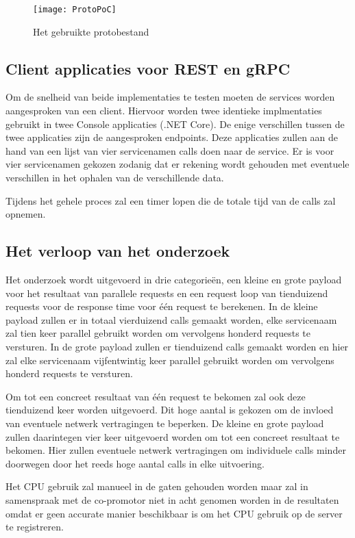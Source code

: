 \begin{figure}[H]
    \centering
    \texttt{[image: ProtoPoC]}
    \caption[Proof-Of-Concept protobestand]{Het gebruikte protobestand}
    \label{fig:ProtoPoC}
\end{figure}

\subsection{Client applicaties voor REST en gRPC}
\label{subsec:Client applicaties voor REST en gRPC}

Om de snelheid van beide implementaties te testen moeten de services worden aangesproken van een client. Hiervoor worden twee identieke implmentaties gebruikt in twee Console applicaties (.NET Core). De enige verschillen tussen de twee applicaties zijn de aangesproken endpoints. Deze applicaties zullen aan de hand van een lijst van vier servicenamen calls doen naar de service. Er is voor vier servicenamen gekozen zodanig dat er rekening wordt gehouden met eventuele verschillen in het ophalen van de verschillende data.

Tijdens het gehele proces zal een timer lopen die de totale tijd van de calls zal opnemen.

\subsection{Het verloop van het onderzoek}
\label{subsec:Het verloop van het onderzoek}

Het onderzoek wordt uitgevoerd in drie categorieën, een kleine en grote payload voor het resultaat van parallele requests en een request loop van tienduizend requests voor de response time voor één request te berekenen. In de kleine payload zullen er in totaal vierduizend calls gemaakt worden, elke servicenaam zal tien keer parallel gebruikt worden om vervolgens honderd requests te versturen. In de grote payload zullen er tienduizend calls gemaakt worden en hier zal elke servicenaam vijfentwintig keer parallel gebruikt worden om vervolgens honderd requests te versturen.

Om tot een concreet resultaat van één request te bekomen zal ook deze tienduizend keer worden uitgevoerd. Dit hoge aantal is gekozen om de invloed van eventuele netwerk vertragingen te beperken.
De kleine en grote payload zullen daarintegen vier keer uitgevoerd worden om tot een concreet resultaat te bekomen. Hier zullen eventuele netwerk vertragingen om individuele calls minder doorwegen door het reeds hoge aantal calls in elke uitvoering.


Het CPU gebruik zal manueel in de gaten gehouden worden maar zal in samenspraak met de co-promotor niet in acht genomen worden in de resultaten omdat er geen accurate manier beschikbaar is om het CPU gebruik op de server te registreren.

